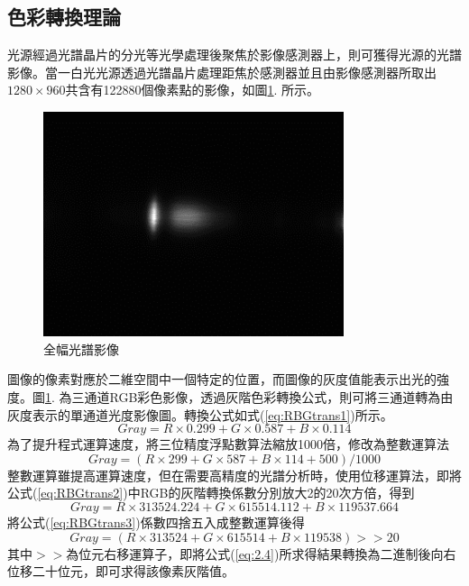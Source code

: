 \subsection{色彩轉換理論}
光源經過光譜晶片的分光等光學處理後聚焦於影像感測器上，則可獲得光源的光譜影像。當一白光光源透過光譜晶片處理距焦於感測器並且由影像感測器所取出$1280\times960$共含有122880個像素點的影像，如圖\ref{2.1,全幅光譜影像}. 所示。
\begin{figure}[H] %
	\centering %
	\vspace{0.8cm} 
	\setlength{\abovecaptionskip}{0.6cm}
	\includegraphics[width=8.8cm]{figures/p2-1.PNG} %
	\caption{全幅光譜影像} %
	\label{2.1,全幅光譜影像} %
\end{figure}
圖像的像素對應於二維空間中一個特定的位置，而圖像的灰度值能表示出光的強度。圖\ref{2.1,全幅光譜影像}. 為三通道RGB彩色影像，透過灰階色彩轉換公式，則可將三通道轉為由灰度表示的單通道光度影像圖。轉換公式如式(\ref{eq:RBGtrans1})所示。
\begin{equation}
\label{eq:RBGtrans1}
Gray = R\times0.299 + G\times0.587 + B\times0.114
\end{equation}
為了提升程式運算速度，將三位精度浮點數算法縮放1000倍，修改為整數運算法
\begin{equation}
	\label{eq:RBGtrans2}
	Gray = (R\times299 + G\times587 + B\times114 + 500) / 1000
\end{equation}
整數運算雖提高運算速度，但在需要高精度的光譜分析時，使用位移運算法，即將公式(\ref{eq:RBGtrans2})中RGB的灰階轉換係數分別放大2的20次方倍，得到
\begin{equation}
	\label{eq:RBGtrans3}
	Gray = R\times313524.224 + G\times615514.112 + B\times119537.664
\end{equation}
將公式(\ref{eq:RBGtrans3})係數四捨五入成整數運算後得
\begin{equation}
	Gray = (R\times313524 + G\times615514 + B\times119538) >> 20
    \label{eq:2.4}
\end{equation}
其中$>>$為位元右移運算子，即將公式(\ref{eq:2.4})所求得結果轉換為二進制後向右位移二十位元，即可求得該像素灰階值。
